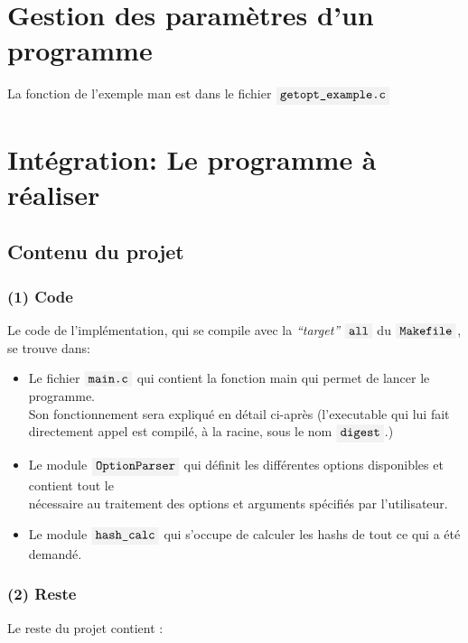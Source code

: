 \documentclass[french]{article}
\newcommand{\code}[1]{$\mbox{\colorbox{light-gray}{\texttt{#1}}}$}
\newcommand{\quo}[1]{``{#1}''}
\begin{document}
\section{Gestion des paramètres d'un programme}
\vspace{0.3cm}

La fonction de l'exemple man est dans le fichier \code{getopt\_example.c}

\vspace{0.3cm}
\section{Intégration: Le programme à réaliser}
\subsection{Contenu du projet}

\subsubsection*{(1) Code}

Le code de l'implémentation, qui se compile avec la
\textit{\quo{target}} \code{all} du \code{Makefile}, se trouve dans:
\begin{itemize}
    \item Le fichier \code{main.c} qui contient la fonction main qui permet de lancer le programme.\\
    Son fonctionnement sera expliqué en détail ci-après
    (l'executable qui lui fait directement appel est compilé, à la racine, sous le nom \code{digest}.)
    
    \item Le module \code{OptionParser} qui définit les différentes options disponibles et contient tout le\\ nécessaire au traitement des options et arguments spécifiés par l'utilisateur.
    
    \item Le module \code{hash\_calc} qui s'occupe de calculer les hashs de tout ce qui a été demandé. 
\end{itemize}

\newpage

\subsubsection*{(2) Reste}
Le reste du projet contient :
\end{document}
